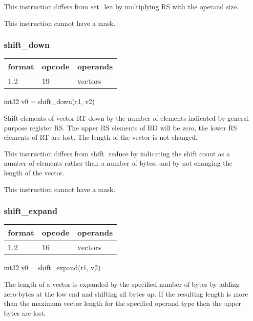 \documentclass[forwardcom.tex]{subfiles}
\begin{document}
\vspace{2mm}
This instruction differs from set\_len by multiplying RS with the operand size.

This instruction cannot have a mask.


\subsubsection{shift\_down}
\label{table:shiftDownInstruction}
\begin{tabular}{|p{12mm}|p{12mm}|p{110mm}|}
\hline
\bfseries format & \bfseries opcode & \bfseries operands \\ \hline
1.2 & 19 & vectors \\ \hline
\end{tabular}
\vspace{2mm}

int32 v0 = shift\_down(r1, v2)
\vspace{2mm}

Shift elements of vector RT down by the number of elements indicated by general purpose register RS. 
The upper RS elements of RD will be zero, the lower RS elements of RT are lost. The length of the vector is not changed.
\vspace{2mm}

This instruction differs from shift\_reduce by indicating the shift count as a number of elements rather than a number of bytes, and by not changing the length of the vector.
\vspace{2mm}

This instruction cannot have a mask.


\subsubsection{shift\_expand}
\label{table:shiftExpandInstruction}
\begin{tabular}{|p{12mm}|p{12mm}|p{110mm}|}
\hline
\bfseries format & \bfseries opcode & \bfseries operands \\ \hline
1.2 & 16 & vectors \\ \hline
\end{tabular}
\vspace{2mm}

int32 v0 = shift\_expand(r1, v2)
\vspace{2mm}

The length of a vector is expanded by the specified number of bytes by adding zero-bytes at the low end and shifting all bytes up. If the resulting length is more than the maximum vector length for the specified operand type then the upper bytes are lost.
\vspace{2mm}
\end{document}
